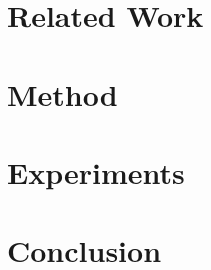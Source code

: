 \documentclass[twocolumn,11pt]{article}
\begin{document}
\section{Related Work}

\section{Method}

\section{Experiments}

\section{Conclusion}


\end{document}

